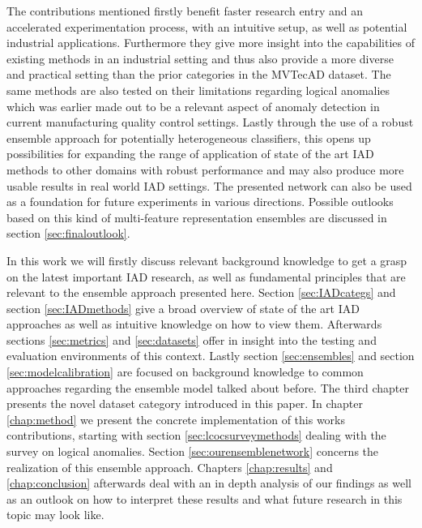 The contributions mentioned firstly benefit faster research entry and an accelerated experimentation process, with an intuitive setup, 
as well as potential industrial applications. 
Furthermore they give more insight into the capabilities of existing methods in an industrial setting and thus also provide a more 
diverse and practical setting than the prior categories in the MVTecAD \cite{LOCODentsAndScratchesBergmann2022} dataset. The same methods are also tested on their limitations 
regarding logical anomalies which was earlier made out to be a relevant aspect of anomaly detection in current manufacturing quality control 
settings. Lastly through the use of a robust ensemble approach for potentially heterogeneous classifiers, this opens up possibilities for expanding 
the range of application of state of the art IAD methods to other domains with robust performance and may also produce more usable results in real 
world IAD settings. The presented network can also be used as a foundation for future experiments in 
various directions. Possible outlooks based on this kind of multi-feature representation ensembles are discussed in section \ref{sec:finaloutlook}.
\newline
\newline

In this work we will firstly discuss relevant background knowledge to get a grasp on the latest important IAD research, as well as fundamental principles that are relevant to the ensemble 
approach presented here. Section \ref{sec:IADcategs} and section \ref{sec:IADmethods} give a broad overview of state of the art IAD approaches as well as intuitive knowledge on how to 
view them. Afterwards sections \ref{sec:metrics} and \ref{sec:datasets} offer in insight into the testing and evaluation environments of this context. Lastly section \ref{sec:ensembles} and 
section \ref{sec:modelcalibration} are focused on background knowledge to common approaches regarding the ensemble model talked about before.\newline
The third chapter presents the novel dataset category introduced in this paper.
In chapter \ref{chap:method} we present the concrete implementation of this works contributions, starting with section \ref{sec:lcocsurveymethods} dealing with the survey on logical anomalies. 
Section \ref{sec:ourensemblenetwork} concerns the realization of this ensemble approach.
\newline 
Chapters \ref{chap:results} and \ref{chap:conclusion} afterwards deal with an in depth analysis of our findings as well as an outlook on how to interpret these results and what future research 
in this topic may look like.






